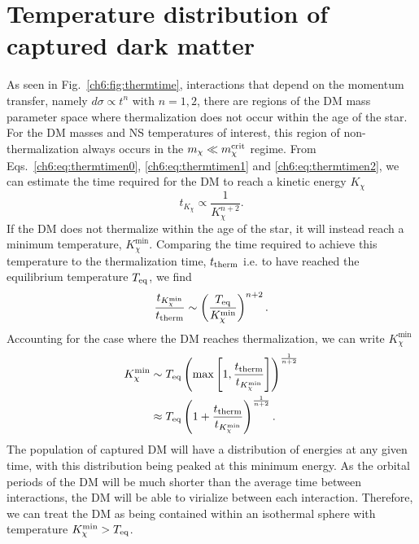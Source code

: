 \section{Temperature distribution of captured dark matter}
\label{app:sec:minTempDerivation}



As seen in Fig.~\ref{ch6:fig:thermtime}, interactions that depend on the momentum transfer, namely $d\sigma \propto t^n$ with $n = 1,2$, there are regions of the DM mass parameter space where thermalization does not occur within the age of the star. For the DM masses and NS temperatures of interest, this region of non-thermalization always occurs in the $m_\chi\ll m_\chi^{\rm crit}$ regime.
From Eqs.~\ref{ch6:eq:thermtimen0}, \ref{ch6:eq:thermtimen1} and \ref{ch6:eq:thermtimen2},  we can estimate the time required for the DM to reach a kinetic energy $K_\chi$ 
\begin{equation}
    t_{K_\chi} \propto \frac{1}{K_\chi^{n+2}}.
\end{equation}
% 
If the DM does not thermalize within the age of the star, it will instead reach a minimum temperature, $K_\chi^{\mathrm{min}}$.  Comparing the time required to achieve this temperature to the thermalization time, $t_{\rm therm}$ i.e. to have reached the equilibrium temperature $T_{\rm eq}$, we find 
\begin{equation}
    \frac{t_{K_\chi^\mathrm{min}}}{t_{\rm therm}}  \sim \left( \frac{T_{\rm eq}}{K^{\rm min}_\chi} \right)^{n+2}. 
\end{equation}
Accounting for the case where the DM reaches thermalization, we can write $K_\chi^\mathrm{min}$
\begin{align}
    K^{\rm min}_\chi & \sim T_{\rm eq} \left(\max\left[ 1,\frac{t_{\rm therm}}{t_{K_\chi^\mathrm{min}}}\right]\right)^{\frac{1}{n + 2}}\\
           & \approx T_{\rm eq} \left( 1 + \frac{t_{\rm therm}}{t_{K_\chi^\mathrm{min}}}\right)^{\frac{1}{n + 2}}. 
\end{align}
The population of captured DM will have a distribution of energies at any given time, with this distribution being peaked at this minimum energy.
As the orbital periods of the DM will be much shorter than the average time between interactions, the DM will be able to virialize between each interaction. Therefore, we can treat the DM as being contained within an isothermal sphere with temperature $K^{\rm min}_\chi > T_{\rm eq}$. 

